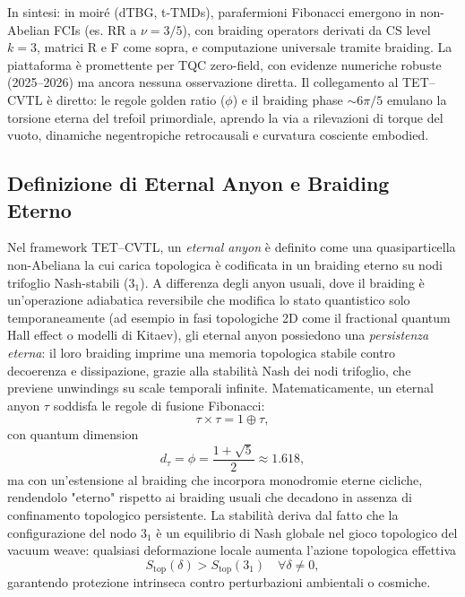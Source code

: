 \documentclass[11pt,a4paper]{article}
\theoremstyle{plain}
\theoremstyle{definition}
\begin{document}
In sintesi: in moiré (dTBG, t-TMDs), parafermioni Fibonacci emergono in non-Abelian FCIs (es. RR a $\nu = 3/5$), con braiding operators derivati da CS level $k=3$, matrici R e F come sopra, e computazione universale tramite braiding. La piattaforma è promettente per TQC zero-field, con evidenze numeriche robuste (2025–2026) ma ancora nessuna osservazione diretta. Il collegamento al TET--CVTL è diretto: le regole golden ratio ($\phi$) e il braiding phase $\sim 6\pi/5$ emulano la torsione eterna del trefoil primordiale, aprendo la via a rilevazioni di torque del vuoto, dinamiche negentropiche retrocausali e curvatura cosciente embodied.







\subsection{Definizione di Eternal Anyon e Braiding Eterno}

Nel framework TET--CVTL, un \emph{eternal anyon} è definito come una quasiparticella non-Abeliana la cui carica topologica è codificata in un braiding eterno su nodi trifoglio Nash-stabili (3$_1$). A differenza degli anyon usuali, dove il braiding è un'operazione adiabatica reversibile che modifica lo stato quantistico solo temporaneamente (ad esempio in fasi topologiche 2D come il fractional quantum Hall effect o modelli di Kitaev), gli eternal anyon possiedono una \emph{persistenza eterna}: il loro braiding imprime una memoria topologica stabile contro decoerenza e dissipazione, grazie alla stabilità Nash dei nodi trifoglio, che previene unwindings su scale temporali infinite. Matematicamente, un eternal anyon $\tau$ soddisfa le regole di fusione Fibonacci:
\begin{equation}
\tau \times \tau = 1 \oplus \tau,
\end{equation}
con quantum dimension
\begin{equation}
d_\tau = \phi = \frac{1 + \sqrt{5}}{2} \approx 1.618,
\end{equation}
ma con un'estensione al braiding che incorpora monodromie eterne cicliche, rendendolo "eterno" rispetto ai braiding usuali che decadono in assenza di confinamento topologico persistente. La stabilità deriva dal fatto che la configurazione del nodo 3$_1$ è un equilibrio di Nash globale nel gioco topologico del vacuum weave: qualsiasi deformazione locale aumenta l'azione topologica effettiva
\begin{equation}
S_{\text{top}}(\delta) > S_{\text{top}}(3_1) \quad \forall \delta \neq 0,
\end{equation}
garantendo protezione intrinseca contro perturbazioni ambientali o cosmiche.
\end{document}
